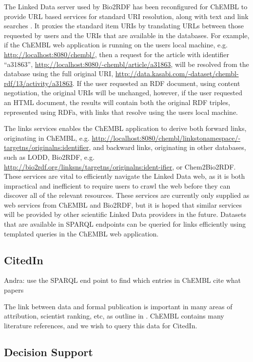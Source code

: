 \documentclass[sw]{iosart2c}
\begin{document}
The Linked Data server used by Bio2RDF has been reconfigured for ChEMBL to provide URL
based services for standard URI resolution, along with text and link searches
\cite{WebAppGitHub}. It proxies the standard item
URIs by translating URLs between those requested by users and the URIs that are available
in the databases. For example, if the ChEMBL web application is running on the users
local machine, e.g. \url{http://localhost:8080/chembl/}, then a request for the
article with identifier ``a31863'', \url{http://localhost:8080/-chembl/article/a31863},
will be resolved from the database using the full original URI,
\url{http://data.kasabi.com/-dataset/chembl-rdf/13/activity/a31863}. If the
user requested an RDF document, using content negotiation, the original URIs will be unchanged,
however, if the user requested an HTML document, the results will contain both the
original RDF triples, represented using RDFa, with links that resolve using the users local machine.

The links services enables the ChEMBL application to derive both forward links, originating in
ChEMBL, e.g. \url{http://localhost:8080/chembl/linkstonamespace/-targetns/originalns:identifier},
and backward links, originating in other databases, such as LODD, Bio2RDF, e.g.
\url{http://bio2rdf.org/linksns/targetns/originalns:ident-ifier}, or Chem2Bio2RDF.
These services are vital to efficiently navigate the Linked Data web, as it is both
impractical and inefficient to require users to crawl the web before they can discover all of the
relevant resources. These services are currently only supplied as web services from ChEMBL and
Bio2RDF, but it is hoped that similar services will be provided by other scientific Linked Data
providers in the future. Datasets that are available in SPARQL endpoints can be queried for
links efficiently using templated queries in the ChEMBL web application.

\subsection{CitedIn}

Andra: use the SPARQL end point to find which entries in ChEMBL cite what papers
 
The link between data and formal publication is important in many areas of
attribution, scientist ranking, etc, as outline in \cite{Waagmeester2012}.
ChEMBL contains many literature references, and we wish to query this data
for CitedIn.

\subsection{Decision Support}
\end{document}
